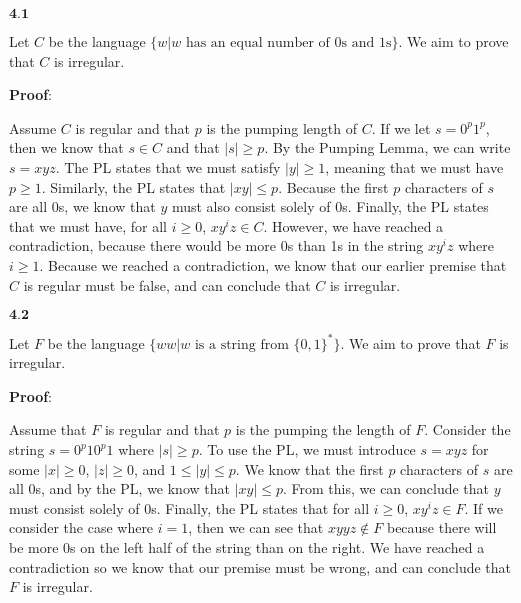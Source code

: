 \documentclass{article}
\newcommand{\problem}[1]{$\boxed{\textbf{#1}}$}
\begin{document}
\begin{minipage}{\textwidth}
\problem{4.1}

Let $C$ be the language $\{w|\text{$w$ has an equal number of 0s and 1s}\}$. We aim to prove that $C$ is irregular.

\textbf{Proof}:

Assume $C$ is regular and that $p$ is the pumping length of $C$. If we
let $s=0^p1^p$, then we know that $s\in{}C$ and that $|s|\ge{}p$. By
the Pumping Lemma, we can write $s=xyz$. The PL states that we must
satisfy $|y|\ge1$, meaning that we must have $p\ge1$. Similarly, the
PL states that $|xy|\le{}p$. Because the first $p$ characters of $s$
are all 0s, we know that $y$ must also consist solely of 0s. Finally,
the PL states that we must have, for all $i\ge0$,
$xy^iz\in{}C$. However, we have reached a contradiction, because there
would be more 0s than 1s in the string $xy^iz$ where $i\ge1$. Because
we reached a contradiction, we know that our earlier premise that $C$
is regular must be false, and can conclude that $C$ is irregular.

\end{minipage}

\begin{minipage}{\textwidth}
\problem{4.2}

Let $F$ be the language $\{ww|\text{$w$ is a string from $\{0,1\}^*$}\}$. We aim to prove that $F$ is irregular.

\textbf{Proof}:

Assume that $F$ is regular and that $p$ is the pumping the length of
$F$. Consider the string $s=0^p10^p1$ where $|s|\ge{}p$. To use the
PL, we must introduce $s=xyz$ for some $|x|\ge0$, $|z|\ge0$, and
$1\le|y|\le{}p$. We know that the first $p$ characters of $s$ are all
0s, and by the PL, we know that $|xy|\le{}p$. From this, we can
conclude that $y$ must consist solely of 0s. Finally, the PL states
that for all $i\ge0$, $xy^iz\in{}F$. If we consider the case where
$i=1$, then we can see that $xyyz\not\in{}F$ because there will be
more 0s on the left half of the string than on the right. We have
reached a contradiction so we know that our premise must be wrong, and
can conclude that $F$ is irregular.

\end{minipage}
\end{document}
